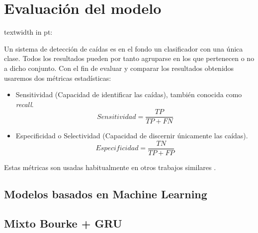 \documentclass[../tfm.tex]{subfiles}
\begin{document}

\section{Evaluación del modelo}
textwidth in pt: \the\textwidth


Un sistema de detección de caídas es en el fondo un clasificador con una única clase. Todos los resultados pueden por tanto agruparse en los que pertenecen o no a dicho conjunto. Con el fin de evaluar y comparar los resultados obtenidos usaremos dos métricas estadísticas:
\begin{itemize}
  \item Sensitividad (Capacidad de identificar las caídas), también conocida como \textit{recall}.
  \[
    Sensitividad = \frac{TP}{TP+FN}
  \]
  \item Especificidad o Selectividad (Capacidad de discernir únicamente las caídas).
  \[
    Especificidad = \frac{TN}{TP+FP}
  \]
\end{itemize}

Estas métricas son usadas habitualmente en otros trabajos similares\cite{Noury2007,Chen2005, Bourke2006}
.



\subsection{Modelos basados en Machine Learning}

\subsection{Mixto Bourke + GRU}
\end{document}
